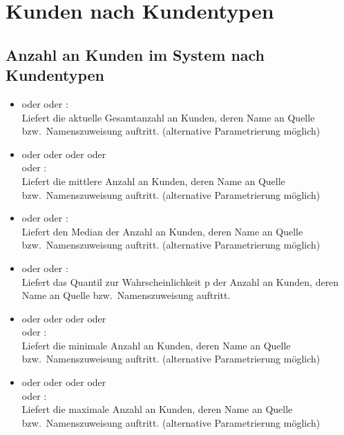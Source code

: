 \section{Kunden nach Kundentypen}



\subsection{Anzahl an Kunden im System nach Kundentypen}

\begin{itemize}

\item
{} oder  oder :\\
Liefert die aktuelle Gesamtanzahl an Kunden, deren Name an Quelle bzw.\ Namenszuweisung  auftritt.
(alternative Parametrierung möglich)

\item
{} oder  oder  oder  oder\\
 oder :\\
Liefert die mittlere Anzahl an Kunden, deren Name an Quelle bzw.\ Namenszuweisung  auftritt.
(alternative Parametrierung möglich)

\item
{} oder  oder :\\
Liefert den Median der Anzahl an Kunden, deren Name an Quelle bzw.\ Namenszuweisung  auftritt.
(alternative Parametrierung möglich)

\item
{} oder  oder :\\
Liefert das Quantil zur Wahrscheinlichkeit p der Anzahl an Kunden, deren Name an Quelle bzw.\ Namenszuweisung  auftritt.

\item
{} oder  oder  oder  oder\\
 oder :\\
Liefert die minimale Anzahl an Kunden, deren Name an Quelle bzw.\ Namenszuweisung  auftritt.
(alternative Parametrierung möglich)

\item
{} oder  oder  oder  oder\\
 oder :\\
Liefert die maximale Anzahl an Kunden, deren Name an Quelle bzw.\ Namenszuweisung  auftritt.
(alternative Parametrierung möglich)


\end{itemize}
